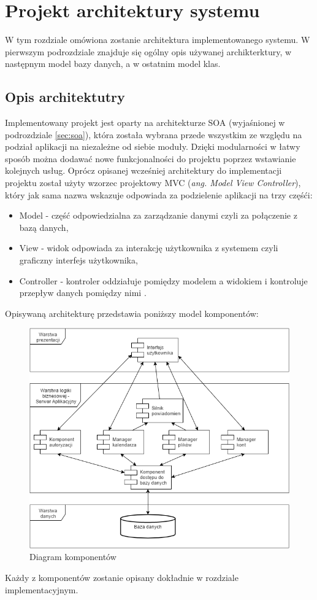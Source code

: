 \chapter{Projekt architektury systemu}
\label{cha:projektSystemu}
W tym rozdziale omówiona zostanie architektura implementowanego systemu. W pierwszym podrozdziale znajduje się ogólny opis używanej archikterktury, w następnym model bazy danych, a w ostatnim model klas.
\section{Opis architektutry}
Implementowany projekt jest oparty na architekturze SOA (wyjaśnionej w podrozdziale \ref{sec:soa}), która została wybrana przede wszystkim ze względu na podział aplikacji na niezależne od siebie moduły. Dzięki modularności w łatwy sposób można dodawać nowe funkcjonalności do projektu poprzez wstawianie kolejnych usług. Oprócz opisanej wcześniej architektury do implementacji projektu został użyty wzorzec projektowy MVC (\textit{ang. Model View Controller}), który jak sama nazwa wskazuje odpowiada za podzielenie aplikacji na trzy częśći:
\begin{itemize}
	\item Model - część odpowiedzialna za zarządzanie danymi czyli za połączenie z bazą danych,
	\item View - widok odpowiada za interakcję użytkownika z systemem czyli graficzny interfejs użytkownika,
	\item Controller - kontroler oddziałuje pomiędzy modelem a widokiem i kontroluje przepływ danych pomiędzy nimi \cite{MVC01}.
\end{itemize}

Opisywaną architekturę przedstawia poniższy model komponentów:
\begin{figure}[H]
\centering
\includegraphics[scale=0.5]{ArchitekturaSystemu}
\caption{\label{fig:diag_01}Diagram komponentów}
\end{figure}
Każdy z komponentów zostanie opisany dokładnie w rozdziale implementacyjnym.

